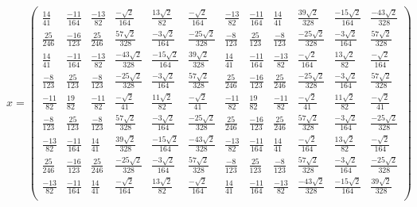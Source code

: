 \setcounter{MaxMatrixCols}{20}
\begin{equation*}
    x =
\begin{pmatrix}
    \frac{14}{41} & \frac{-11}{164} & \frac{-13}{82} & \frac{-\sqrt{2}}{164} & \frac{13\sqrt{2}}{82} & \frac{-\sqrt{2}}{164} & \frac{-13}{82} & \frac{-11}{164} & \frac{14}{41} & \frac{39\sqrt{2}}{328} & \frac{-15\sqrt{2}}{164} & \frac{-43\sqrt{2}}{328} \\
    \frac{25}{246} & \frac{-16}{123} & \frac{25}{246} & \frac{57\sqrt{2}}{328} & \frac{-3\sqrt{2}}{164} & \frac{-25\sqrt{2}}{328} & \frac{-8}{123} & \frac{25}{123} & \frac{-8}{123} & \frac{-25\sqrt{2}}{328} & \frac{-3\sqrt{2}}{164} & \frac{57\sqrt{2}}{328} \\
    \frac{14}{41} & \frac{-11}{164} & \frac{-13}{82} & \frac{-43\sqrt{2}}{328} & \frac{-15\sqrt{2}}{164} & \frac{39\sqrt{2}}{328} & \frac{14}{41} & \frac{-11}{164} & \frac{-13}{82} & \frac{-\sqrt{2}}{164} & \frac{13\sqrt{2}}{82} & \frac{-\sqrt{2}}{164} \\
    \frac{-8}{123} & \frac{25}{123} & \frac{-8}{123} & \frac{-25\sqrt{2}}{328} & \frac{-3\sqrt{2}}{164} & \frac{57\sqrt{2}}{328} & \frac{25}{246} & \frac{-16}{123} & \frac{25}{246} & \frac{-25\sqrt{2}}{328} & \frac{-3\sqrt{2}}{164} & \frac{57\sqrt{2}}{328} \\
    \frac{-11}{82} & \frac{19}{82} & \frac{-11}{82} & \frac{-\sqrt{2}}{41} & \frac{11\sqrt{2}}{82} & \frac{-\sqrt{2}}{41} & \frac{-11}{82} & \frac{19}{82} & \frac{-11}{82} & \frac{-\sqrt{2}}{41} & \frac{11\sqrt{2}}{82} & \frac{-\sqrt{2}}{41} \\
    \frac{-8}{123} & \frac{25}{123} & \frac{-8}{123} & \frac{57\sqrt{2}}{328} & \frac{-3\sqrt{2}}{164} & \frac{-25\sqrt{2}}{328} & \frac{25}{246} & \frac{-16}{123} & \frac{25}{246} & \frac{57\sqrt{2}}{328} & \frac{-3\sqrt{2}}{164} & \frac{-25\sqrt{2}}{328} \\
    \frac{-13}{82} & \frac{-11}{164} & \frac{14}{41} & \frac{39\sqrt{2}}{328} & \frac{-15\sqrt{2}}{164} & \frac{-43\sqrt{2}}{328} & \frac{-13}{82} & \frac{-11}{164} & \frac{14}{41} & \frac{-\sqrt{2}}{164} & \frac{13\sqrt{2}}{82} & \frac{-\sqrt{2}}{164} \\
    \frac{25}{246} & \frac{-16}{123} & \frac{25}{246} & \frac{-25\sqrt{2}}{328} & \frac{-3\sqrt{2}}{164} & \frac{57\sqrt{2}}{328} & \frac{-8}{123} & \frac{25}{123} & \frac{-8}{123} & \frac{57\sqrt{2}}{328} & \frac{-3\sqrt{2}}{164} & \frac{-25\sqrt{2}}{328} \\
    \frac{-13}{82} & \frac{-11}{164} & \frac{14}{41} & \frac{-\sqrt{2}}{164} & \frac{13\sqrt{2}}{82} & \frac{-\sqrt{2}}{164} & \frac{14}{41} & \frac{-11}{164} & \frac{-13}{82} & \frac{-43\sqrt{2}}{328} & \frac{-15\sqrt{2}}{164} & \frac{39\sqrt{2}}{328} \\
\end{pmatrix}
\end{equation*}
